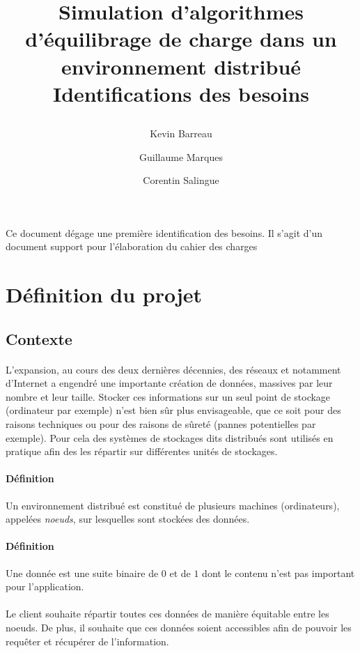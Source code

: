 \documentclass[12pt]{article}
\title{
 \begin{minipage}\linewidth
        \centering
        Simulation d'algorithmes d'équilibrage de charge dans un environnement distribué 
        \vskip3pt
        \large Identifications des besoins
    \end{minipage}
 }
\author{Kevin Barreau \and Guillaume Marques \and Corentin Salingue}
\begin{document}
\maketitle

\abstract
Ce document dégage une première identification des besoins.
Il s'agit d'un document support pour l'élaboration du cahier des charges

\newpage

\renewcommand{\contentsname}{Sommaire} 

\tableofcontents

\newpage

\section{Définition du projet}

\subsection{Contexte}

\paragraph{}
L'expansion, au cours des deux dernières décennies, des réseaux et notamment d'Internet a engendré une importante création de données, massives par leur nombre et leur taille.
Stocker ces informations sur un seul point de stockage (ordinateur par exemple) n'est bien sûr plus envisageable, que ce soit pour des raisons techniques ou pour des raisons de sûreté (pannes potentielles par exemple).
Pour cela des systèmes de stockages dits distribués sont utilisés en pratique afin des les répartir sur différentes unités de stockages.

\paragraph{Définition} Un environnement distribué est constitué de plusieurs machines (ordinateurs), appelées \textit{noeuds}, sur lesquelles sont stockées des données.

\paragraph{Définition} Une donnée est une suite binaire de $0$ et de $1$ dont le contenu n'est pas important pour l'application.

\paragraph{} Le client souhaite répartir toutes ces données de manière équitable entre les noeuds. De plus, il souhaite que ces données soient accessibles afin de pouvoir les requêter et récupérer de l'information.
\end{document}
